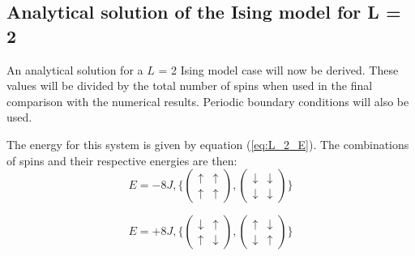 \documentclass[10pt,a4paper,titlepage]{article}
\begin{document}
\subsection{Analytical solution of the Ising model for L = 2}
An analytical solution for a $L$ = 2 Ising model case will now be derived. These values will be divided by the total number of spins when used in the final comparison with the numerical results. Periodic boundary conditions will also be used. 

The energy for this system is given by equation (\ref{eq:L_2_E}). 
The combinations of spins and their respective energies are then:
\begin{equation}
E = -8J, \bigg\{
  \begin{pmatrix}
    \uparrow & \uparrow \\
    \uparrow & \uparrow
  \end{pmatrix},
  \begin{pmatrix}
    \downarrow & \downarrow \\
    \downarrow & \downarrow
  \end{pmatrix} \bigg\}
\end{equation}

\begin{equation}
E = +8J, \bigg\{
  \begin{pmatrix}
    \downarrow & \uparrow \\
    \uparrow & \downarrow
  \end{pmatrix},
  \begin{pmatrix}
    \uparrow & \downarrow \\
    \downarrow & \uparrow
  \end{pmatrix} \bigg\}
\end{equation}
\end{document}
